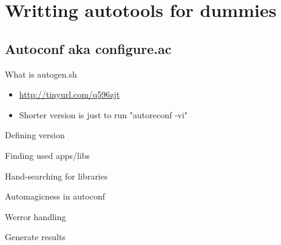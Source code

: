 \documentclass{beamer}
\begin{document}
\section{Writting autotools for dummies}

\subsection{Autoconf aka configure.ac}

\begin{frame}[t]{What is autogen.sh}
	\begin{itemize}
	\item \url{http://tinyurl.com/q596zjt} \\
	\item Shorter version is just to run "autoreconf -vi"
	\end{itemize}
\end{frame}

\begin{frame}[t]{Defining version}
	\begin{small}
	
	\end{small}
\end{frame}

\begin{frame}[t]{Finding used apps/libs}
	\begin{small}
	
	\end{small}
\end{frame}

\begin{frame}[t]{Hand-searching for libraries}
	\begin{small}
	
	\end{small}
\end{frame}

\begin{frame}[t]{Automagicness in autoconf}
	\begin{small}
	
	\end{small}
\end{frame}

\begin{frame}[t]{Werror handling}
	\begin{small}
	
	\end{small}
\end{frame}

\begin{frame}[t]{Generate results}
	\begin{small}
	
	\end{small}
\end{frame}
\end{document}

